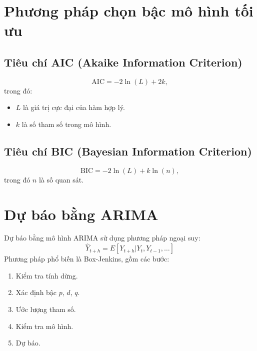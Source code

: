 \section{Phương pháp chọn bậc mô hình tối ưu}

\subsection{Tiêu chí AIC (Akaike Information Criterion)}
\begin{equation}
    \text{AIC} = -2 \ln(L) + 2k,
\end{equation}
trong đó:
\begin{itemize}
    \item $L$ là giá trị cực đại của hàm hợp lý.
    \item $k$ là số tham số trong mô hình.
\end{itemize}

\subsection{Tiêu chí BIC (Bayesian Information Criterion)}
\begin{equation}
    \text{BIC} = -2 \ln(L) + k \ln(n),
\end{equation}
trong đó $n$ là số quan sát.

\section{Dự báo bằng ARIMA}
Dự báo bằng mô hình ARIMA sử dụng phương pháp ngoại suy:
\begin{equation}
    \hat{Y}_{t+h} = E[Y_{t+h} | Y_t, Y_{t-1}, \dots]
\end{equation}
Phương pháp phổ biến là Box-Jenkins, gồm các bước:
\begin{enumerate}
    \item Kiểm tra tính dừng.
    \item Xác định bậc $p$, $d$, $q$.
    \item Ước lượng tham số.
    \item Kiểm tra mô hình.
    \item Dự báo.
\end{enumerate}